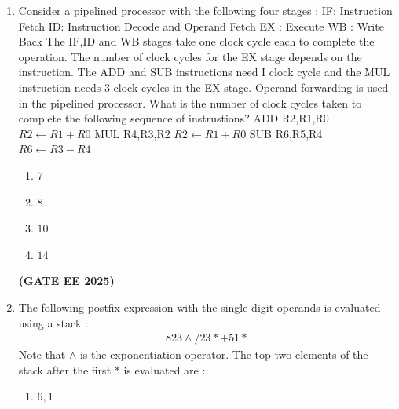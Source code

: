 \documentclass[journal,12pt,onecolumn]{IEEEtran}
\theoremstyle{remark}
\begin{document}
\begin {center}
\begin{enumerate}
\begin{enumerate}
\begin{multicols}{2}
               \end{multicols} 
            \end{enumerate}
           \hfill \textbf{(GATE EE 2025)}
             
            \item Consider a pipelined processor with the following four stages :
            \newline
            IF: Instruction Fetch 
            \newline
            ID: Instruction Decode and Operand Fetch 
            \newline 
            EX : Execute
            \newline 
            WB : Write Back
            \newline
            The IF,ID and WB stages take one clock cycle each to complete the operation. The number of clock cycles  for the EX stage depends on the instruction. The ADD and SUB instructions need I clock  cycle and the MUL instruction needs $3$ clock cycles in the EX stage. Operand forwarding is used in the pipelined processor. What is the number of clock cycles taken to complete the following sequence of instrustions?
            \newline 
            ADD  R2,R1,R0  \quad    $ R2 \longleftarrow R1+R0 $  
            \newline
            MUL R4,R3,R2  \quad    $ R2 \longleftarrow R1+R0 $ 
            SUB  R6,R5,R4 \quad    $ R6 \longleftarrow R3-R4$
            \begin{enumerate}
                \item $7$
                \item $8$
                \item $10$
                \item $14$
            \end{enumerate}
            \hfill \textbf{(GATE EE 2025)}
            \item The following postfix expression with the single digit operands  is evaluated using a stack :
            \newline
    \begin{align}
        823 \wedge  / 23 * +51 *
    \end{align}
    \newline
    Note that $\wedge$ is the exponentiation operator. The top two elements of the stack after the first $*$ is evaluated are :
    \begin{enumerate}
        \item $6,1$

\end{enumerate}
\end{enumerate}
\end{center}
\end{document}
